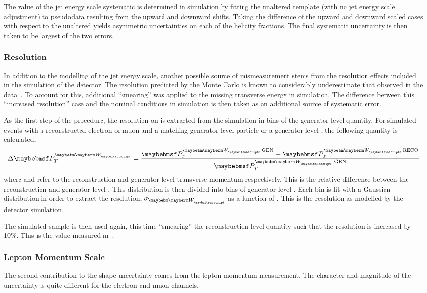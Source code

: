 The value of the jet energy scale systematic is determined in simulation by
fitting the unaltered template (with no jet energy scale adjustment) to
pseudodata resulting from the upward and downward shifts. Taking the difference
of the upward and downward scaled cases with respect to the unaltered yields
asymmetric uncertainties on each of the helicity fractions. The final systematic
uncertainty is then taken to be largest of the two errors.

\subsubsection{\MET Resolution}
In addition to the modelling of the jet energy scale, another possible source of
mismeasurement stems from the resolution effects included in the simulation of
the detector. The resolution predicted by the Monte Carlo is known to
considerably underestimate that observed in the data~\cite{cms_met_paper,
  cms_met_pas}. To account for this, additional ``smearing'' was applied to the
missing transverse energy in simulation. The difference between this ``increased
resolution'' case and the nominal conditions in simulation is then taken as an
additional source of systematic error.

As the first step of the procedure, the resolution on \PtW is extracted from the
simulation in bins of the generator level \PtW quantity. For simulated \Wjets
events with a reconstructed electron or muon and a matching generator level
particle or a generator level \Ptau, the following quantity is calculated,
\begin{equation}
\Delta\PtW = \frac{\PtWgen - \PtWreco}{\PtWgen}
\end{equation}
where \PtWreco and \PtWgen refer to the reconstruction and generator level \PW
transverse momentum respectively. This is the relative difference between the
reconstruction and generator level \PtW. This distribution is then divided into
bins of generator level \PtW. Each bin is fit with a Gaussian distribution in
order to extract the resolution, $\sigma_{\PW}$ as a function of \PtW. This is
the \PtW resolution as modelled by the detector simulation.

The simulated sample is then used again, this time ``smearing'' the
reconstruction level \PtW quantity such that the resolution is increased by
10\%. This is the value measured in~\cite{cms_met_paper}.

\subsubsection{Lepton Momentum Scale}
The second contribution to the \LP shape uncertainty comes from the lepton
momentum measurement. The character and magnitude of the uncertainty is quite
different for the electron and muon channels.

